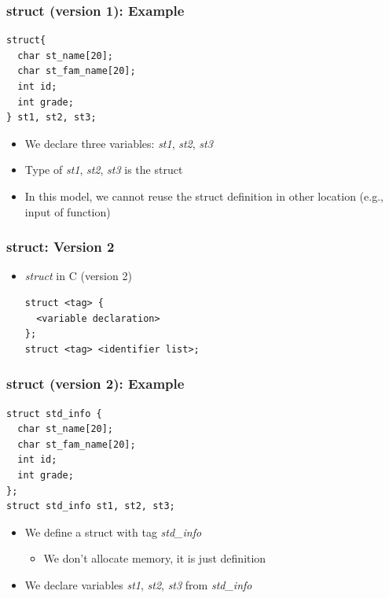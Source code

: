 \documentclass{../c-lecture}
\begin{document}
\begin{frame}[fragile]
  \frametitle{struct (version 1): Example}
  \begin{verbatim}
struct{
  char st_name[20];
  char st_fam_name[20];
  int id;
  int grade;
} st1, st2, st3;
  \end{verbatim}
  \begin{itemize}
    \item
      We declare three variables: \textit{\color{YellowOrange} st1},
      \textit{\color{YellowOrange} st2},
      \textit{\color{YellowOrange} st3}
    \item
      Type of \textit{\color{YellowOrange}st1},
      \textit{\color{YellowOrange} st2}, \textit{\color{YellowOrange} st3} is
      the struct
    \item
      In this model, we cannot reuse the struct definition in other location
      (e.g., input of function)
  \end{itemize}
\end{frame}

\begin{frame}[fragile]
  \frametitle{struct: Version 2}
  \begin{itemize}
    \item \textit{\color{Cyan} struct} in C (version 2)
    \begin{verbatim}
struct <tag> {
  <variable declaration>
};
struct <tag> <identifier list>;
    \end{verbatim}
  \end{itemize}
\end{frame}

\begin{frame}[fragile]
  \frametitle{struct (version 2): Example}
  \begin{verbatim}
struct std_info {
  char st_name[20];
  char st_fam_name[20];
  int id;
  int grade;
};
struct std_info st1, st2, st3;
  \end{verbatim}
  \begin{itemize}
    \item We define a struct with tag \textit{\color{YellowOrange} std\_info}
    \begin{itemize}
      \item We don’t allocate memory, it is just definition
    \end{itemize}
    \item
      We declare variables \textit{\color{LimeGreen} st1},
      \textit{\color{LimeGreen} st2}, \textit{\color{LimeGreen}st3} from
      \textit{\color{YellowOrange} std\_info}
  \end{itemize}
\end{frame}
\end{document}

